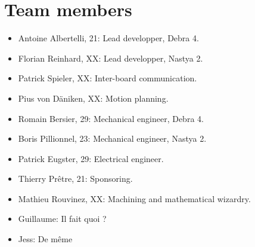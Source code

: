 \documentclass[a4paper]{paper}
\begin{document}
\section{Team members}
\begin{itemize}
    \item Antoine Albertelli, 21:  Lead developper, Debra 4.
    \item Florian Reinhard, XX:  Lead developper, Nastya 2.
    \item Patrick Spieler, XX:  Inter-board communication.
    \item Pius von Däniken, XX:  Motion planning.
    \item Romain Bersier, 29:  Mechanical engineer, Debra 4.
    \item Boris Pillionnel, 23:  Mechanical engineer, Nastya 2.
    \item Patrick Eugster, 29:  Electrical engineer.
    \item Thierry Prêtre, 21:  Sponsoring.
    \item Mathieu Rouvinez, XX:  Machining and mathematical wizardry.
    \item Guillaume:  Il fait quoi ?
    \item Jess:  De même
\end{itemize}
\end{document}

